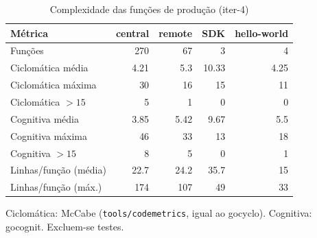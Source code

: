 \begin{table}[htbp]
  \centering\small
  \caption{Complexidade das funções de produção (iter-4)}
  \label{tab:iter-4-complexidade}
  \begin{tabular}{lrrrr}
    \toprule
    Métrica & central & remote & SDK & hello-world \\
    \midrule
    Funções & 270 & 67 & 3 & 4 \\
    Ciclomática média & 4.21 & 5.3 & 10.33 & 4.25 \\
    Ciclomática máxima & 30 & 16 & 15 & 11 \\
    Ciclomática $>15$ & 5 & 1 & 0 & 0 \\
    Cognitiva média & 3.85 & 5.42 & 9.67 & 5.5 \\
    Cognitiva máxima & 46 & 33 & 13 & 18 \\
    Cognitiva $>15$ & 8 & 5 & 0 & 1 \\
    Linhas/função (média) & 22.7 & 24.2 & 35.7 & 15 \\
    Linhas/função (máx.) & 174 & 107 & 49 & 33 \\
    \bottomrule
  \end{tabular}
  \par\smallskip\footnotesize Ciclomática: McCabe (\texttt{tools/codemetrics}, igual ao gocyclo). Cognitiva: gocognit. Excluem-se testes.
\end{table}
